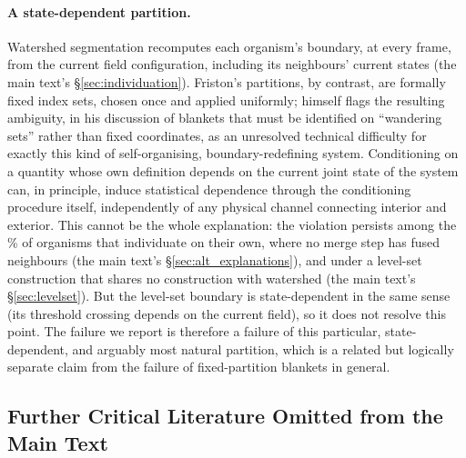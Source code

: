 \documentclass[11pt]{article}
\begin{document}
\paragraph{A state-dependent partition.} Watershed segmentation recomputes each organism's boundary, at every frame, from the current field configuration, including its neighbours' current states (the main text's \S\ref{sec:individuation}). Friston's partitions, by contrast, are formally fixed index sets, chosen once and applied uniformly; \citet{Friston2013} himself flags the resulting ambiguity, in his discussion of blankets that must be identified on ``wandering sets'' rather than fixed coordinates, as an unresolved technical difficulty for exactly this kind of self-organising, boundary-redefining system. Conditioning on a quantity whose own definition depends on the current joint state of the system can, in principle, induce statistical dependence through the conditioning procedure itself, independently of any physical channel connecting interior and exterior. This cannot be the whole explanation: the violation persists among the \% of organisms that individuate on their own, where no merge step has fused neighbours (the main text's \S\ref{sec:alt_explanations}), and under a level-set construction that shares no construction with watershed (the main text's \S\ref{sec:levelset}). But the level-set boundary is state-dependent in the same sense (its threshold crossing depends on the current field), so it does not resolve this point. The failure we report is therefore a failure of this particular, state-dependent, and arguably most natural partition, which is a related but logically separate claim from the failure of fixed-partition blankets in general.

\subsection{Further Critical Literature Omitted from the Main Text}
\label{sec:S_more_lit}
\end{document}
